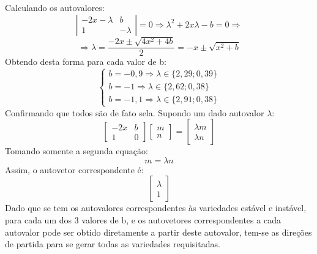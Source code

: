 \documentclass{article}[twocolumn]
\begin{document}
	Calculando os autovalores:
	\begin{equation}
		\left|\begin{array}{cc}
			-2x - \lambda & b\\
			1 & -\lambda
		\end{array}\right| = 0 \Rightarrow
		\lambda^2 + 2x\lambda - b = 0 \Rightarrow
		\nonumber
	\end{equation}
	\begin{equation}
		\Rightarrow \lambda = \frac{-2x \pm \sqrt{4x^2 + 4b}}{2} =
		-x \pm \sqrt{x^2 + b}
		\nonumber
	\end{equation}
	Obtendo desta forma para cada valor de b:
	\begin{equation}
		\left\{\begin{array}{l}
			b = -0,9 \Rightarrow \lambda \in \{2,29; 0,39\}\\
			b = -1 \Rightarrow \lambda \in \{2,62; 0,38\}\\
			b = -1,1 \Rightarrow \lambda \in \{2,91; 0,38\}
		\end{array}\right.
	\end{equation}
	Confirmando que todos s\~ao de fato sela.
	Supondo um dado autovalor $\lambda$:
	\begin{equation}
		\left[\begin{array}{cc}
			-2x & b\\
			1 & 0
		\end{array}\right]
		\left[\begin{array}{c}
			m\\n
		\end{array}\right] =
		\left[\begin{array}{c}
			\lambda m\\ \lambda n
		\end{array}\right]
		\nonumber
	\end{equation}
	Tomando somente a segunda equa\c{c}\~ao:
	\begin{equation}
		m = \lambda n
		\nonumber
	\end{equation}
	Assim, o autovetor correspondente \'e:
	\begin{equation}
		\left[\begin{array}{c}
			\lambda \\ 1
		\end{array}\right]
	\end{equation}
	Dado que se tem os autovalores correspondentes \`as variedades est\'avel e inst\'avel,
	para cada um dos 3 valores de b, e os autovetores correspondentes a cada autovalor pode
	ser obtido diretamente a partir deste autovalor, tem-se as dire\c{c}\~oes de partida
	para se gerar todas as variedades requisitadas.
\end{document}
